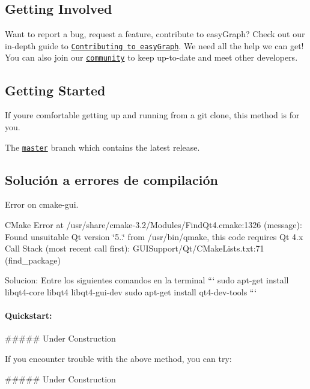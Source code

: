 \subsection*{Getting Involved}

Want to report a bug, request a feature, contribute to easy\+Graph? Check out our in-\/depth guide to \href{CONTRIBUTING.md#contributing-to-easyGraph}{\tt Contributing to easy\+Graph}. We need all the help we can get! You can also join our \href{README.md#community}{\tt community} to keep up-\/to-\/date and meet other developers.

\subsection*{Getting Started}

If you\textquotesingle{}re comfortable getting up and running from a {\ttfamily git clone}, this method is for you.

The \href{https://github.com/JairFrancesco/easyGraph}{\tt master} branch which contains the latest release.

\subsection*{Solución a errores de compilación}


\begin{DoxyEnumerate}
\item Error on cmake-\/gui.

C\+Make Error at /usr/share/cmake-\/3.2/\+Modules/\+Find\+Qt4.\+cmake\+:1326 (message)\+: Found unsuitable Qt version \char`\"{}5..\char`\"{} from /usr/bin/qmake, this code requires Qt 4.\+x Call Stack (most recent call first)\+: G\+U\+I\+Support/\+Qt/\+C\+Make\+Lists.\+txt\+:71 (find\+\_\+package)

Solucion\+: Entre los siguientes comandos en la terminal ``` sudo apt-\/get install libqt4-\/core libqt4 libqt4-\/gui-\/dev sudo apt-\/get install qt4-\/dev-\/tools ``` \paragraph*{Quickstart\+:}

\begin{DoxyVerb}##### Under Construction
\end{DoxyVerb}

\end{DoxyEnumerate}

If you encounter trouble with the above method, you can try\+: \begin{DoxyVerb}##### Under Construction
\end{DoxyVerb}


